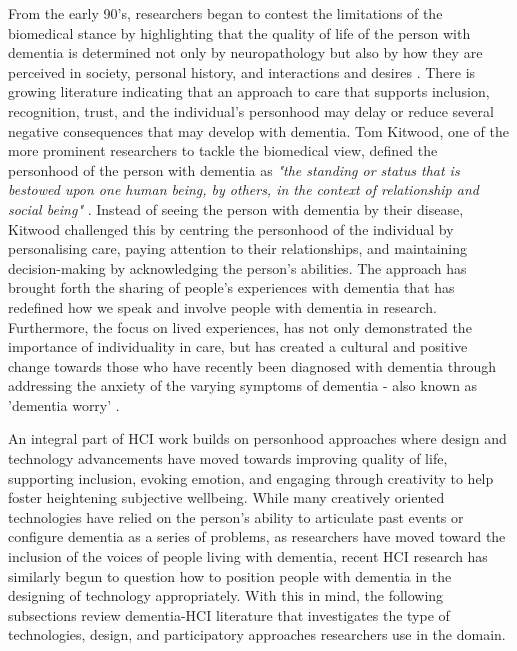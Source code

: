From the early 90's, researchers began to contest the limitations of the biomedical stance by highlighting that the quality of life of the person with dementia is determined not only by neuropathology but also by how they are perceived in society, personal history, and interactions and desires \citep{o2007personhood}. There is growing literature indicating that an approach to care that supports inclusion, recognition, trust, and the individual's personhood may delay or reduce several negative consequences that may develop with dementia. Tom Kitwood, one of the more prominent researchers to tackle the biomedical view, defined the personhood of the person with dementia as \textit{"the standing or status that is bestowed upon one human being, by others, in the context of relationship and social being"} \citep[pg.8]{kitwood1997dementia}. Instead of seeing the person with dementia by their disease, Kitwood challenged this by centring the personhood of the individual by personalising care, paying attention to their relationships, and maintaining decision-making by acknowledging the person's abilities. The approach has brought forth the sharing of people's experiences with dementia that has redefined how we speak and involve people with dementia in research. Furthermore, the focus on lived experiences, has not only demonstrated the importance of individuality in care, but has created a cultural and positive change towards those who have recently been diagnosed with dementia through addressing the anxiety of the varying symptoms of dementia - also known as 'dementia worry' \citep{kessler_dementia_2012}.

An integral part of HCI work builds on personhood approaches where design and technology advancements have moved towards improving quality of life, supporting inclusion, evoking emotion, and engaging through creativity to help foster heightening subjective wellbeing. While many creatively oriented technologies have relied on the person's ability to articulate past events or configure dementia as a series of problems, as researchers have moved toward the inclusion of the voices of people living with dementia, recent HCI research has similarly begun to question how to position people with dementia in the designing of technology appropriately. With this in mind, the following subsections review dementia-HCI literature that investigates the type of technologies, design, and participatory approaches researchers use in the domain.

